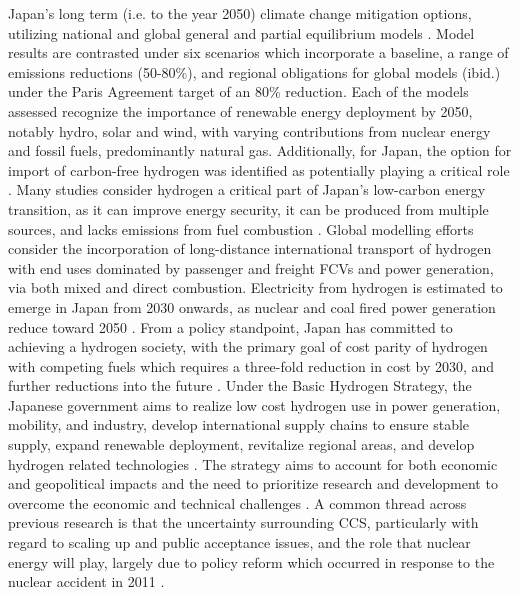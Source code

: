 Japan's long term (i.e. to the year 2050) climate change mitigation options, utilizing national and global general and partial equilibrium models \cite{sugiyama_japans_2019}. Model results are contrasted under six scenarios which incorporate a baseline, a range of emissions reductions (50-80\%), and regional obligations for global models (ibid.) under the Paris Agreement target of an 80\% reduction. Each of the models assessed recognize the importance of renewable energy deployment by 2050, notably hydro, solar and wind, with varying contributions from nuclear energy and fossil fuels, predominantly natural gas. Additionally, for Japan, the option for import of carbon-free hydrogen was identified as potentially playing a critical role \cite{akimoto_estimates_2010, matsuo_global_2013, oshiro_diffusion_2015, oshiro_diffusion_2015, sugiyama_japans_2019}. Many studies consider hydrogen a critical part of Japan's low-carbon energy transition, as it can improve energy security, it can be produced from multiple sources, and lacks emissions from fuel combustion \cite{iida_hydrogen_2019}. Global modelling efforts consider the incorporation of long-distance international transport of hydrogen with end uses dominated by passenger and freight \gls{FCV}s and power generation, via both mixed and direct combustion. Electricity from hydrogen is estimated to emerge in Japan from 2030 onwards, as nuclear and coal fired power generation reduce toward 2050 \cite{ishimoto_significance_2017}. From a policy standpoint, Japan has committed to achieving a hydrogen society, with the primary goal of cost parity of hydrogen with competing fuels which requires a three-fold reduction in cost by 2030, and further reductions into the future \cite{nagashima_japans_2018}. Under the Basic Hydrogen Strategy, the Japanese government aims to realize low cost hydrogen use in power generation, mobility, and industry, develop international supply chains to ensure stable supply, expand renewable deployment, revitalize regional areas, and develop hydrogen related technologies \cite{noauthor_basic_2017}. The strategy aims to account for both economic and geopolitical impacts and the need to prioritize research and development to overcome the economic and technical challenges \cite{nagashima_japans_2018}. A common thread across previous research is that the uncertainty surrounding \gls{CCS}, particularly with regard to scaling up and public acceptance issues, and the role that nuclear energy will play, largely due to policy reform which occurred in response to the nuclear accident in 2011 \cite{oshiro_mid-century_2019}.

